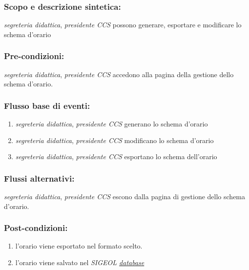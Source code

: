 \documentclass[11pt,a4paper]{article}
\begin{document}
\subsubsection*{Scopo e descrizione sintetica:}
\textit{segreteria didattica}, \textit{presidente CCS} possono generare, esportare e modificare lo schema d'orario
\subsubsection*{Pre-condizioni:}
\textit{segreteria didattica}, \textit{presidente CCS} accedono alla pagina della gestione dello schema d'orario.
\subsubsection*{Flusso base di eventi:}
\begin{enumerate} 
 \item \textit{segreteria didattica}, \textit{presidente CCS} generano lo schema d'orario
 \item \textit{segreteria didattica}, \textit{presidente CCS} modificano lo schema d'orario
 \item \textit{segreteria didattica}, \textit{presidente CCS} esportano lo schema dell'orario
\end{enumerate}
\subsubsection*{Flussi alternativi:}
 \textit{segreteria didattica}, \textit{presidente CCS} escono dalla pagina di gestione dello schema d'orario.
\subsubsection*{Post-condizioni:}
\begin{enumerate}
 \item l'orario viene esportato nel formato scelto.
 \item l'orario viene salvato nel \textit{SIGEOL \underline{database}}
\end{enumerate}  
\end{document}
